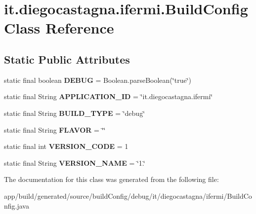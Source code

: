\hypertarget{classit_1_1diegocastagna_1_1ifermi_1_1_build_config}{}\section{it.\+diegocastagna.\+ifermi.\+Build\+Config Class Reference}
\label{classit_1_1diegocastagna_1_1ifermi_1_1_build_config}
\subsection*{Static Public Attributes}
\begin{DoxyCompactItemize}
\item 
\mbox{\label{classit_1_1diegocastagna_1_1ifermi_1_1_build_config_aac355de6513b3a68d8bc991d3197d12b}} 
static final boolean {\bfseries D\+E\+B\+UG} = Boolean.\+parse\+Boolean(\char`\"{}true\char`\"{})
\item 
\mbox{\label{classit_1_1diegocastagna_1_1ifermi_1_1_build_config_a9f4d360aa0c72ed35c5157f5030c35af}} 
static final String {\bfseries A\+P\+P\+L\+I\+C\+A\+T\+I\+O\+N\+\_\+\+ID} = \char`\"{}it.\+diegocastagna.\+ifermi\char`\"{}
\item 
\mbox{\label{classit_1_1diegocastagna_1_1ifermi_1_1_build_config_abd19c698bd9081dd8f706c0b03af6d11}} 
static final String {\bfseries B\+U\+I\+L\+D\+\_\+\+T\+Y\+PE} = \char`\"{}debug\char`\"{}
\item 
\mbox{\label{classit_1_1diegocastagna_1_1ifermi_1_1_build_config_a75cc3888c42a21ce09a5cf04eeaa7d23}} 
static final String {\bfseries F\+L\+A\+V\+OR} = \char`\"{}\char`\"{}
\item 
\mbox{\label{classit_1_1diegocastagna_1_1ifermi_1_1_build_config_a075c219a929571f9e31f6b1b8ed3d5fa}} 
static final int {\bfseries V\+E\+R\+S\+I\+O\+N\+\_\+\+C\+O\+DE} = 1
\item 
\mbox{\label{classit_1_1diegocastagna_1_1ifermi_1_1_build_config_ac1341e17db988b3f7810f8f27a78974f}} 
static final String {\bfseries V\+E\+R\+S\+I\+O\+N\+\_\+\+N\+A\+ME} = \char`\"{}1.\char`\"{}
\end{DoxyCompactItemize}


The documentation for this class was generated from the following file\+:\begin{DoxyCompactItemize}
\item 
app/build/generated/source/build\+Config/debug/it/diegocastagna/ifermi/Build\+Config.\+java\end{DoxyCompactItemize}
